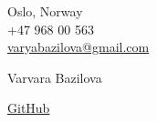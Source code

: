 \documentclass[a4,10pt]{article}
\newcommand{\hskills}[1]{
\textbf{\bfseries #1} }
\begin{document}
\begin{center}
    \begin{minipage}[b]{0.24\textwidth}
            \large Oslo, Norway \\
            \large +47 968 00 563 \\
            \large \href{mailto:varyabazilova@gmail.com}{varyabazilova@gmail.com} 
    \end{minipage}%
    \begin{minipage}[b]{0.5\textwidth}
            \centering
            {\HUGE Varvara Bazilova} \\ %
            \vspace{0.1cm}
    \end{minipage}%
    \begin{minipage}[b]{0.24\textwidth}
            \flushright \large  %
            \href{https://github.com/varyabazilova}{GitHub}
    \end{minipage}   
    
\end{center}
\end{document}
